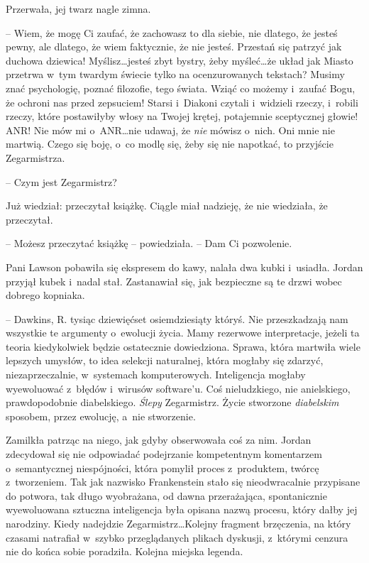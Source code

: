 \documentclass[oneside,polish,11pt,sfheadings]{mwbk}
\begin{document}
Przerwała, jej twarz nagle zimna.

-- Wiem, że mogę Ci zaufać, że zachowasz to dla siebie, nie dlatego, że
jesteś pewny, ale dlatego, że wiem faktycznie, że nie jesteś. Przestań
się patrzyć jak duchowa dziewica! Myślisz\ldots jesteś zbyt bystry, żeby
myśleć\ldots że układ jak Miasto przetrwa w~tym twardym świecie tylko na
ocenzurowanych tekstach? Musimy znać psychologię, poznać filozofie, tego
świata. Wziąć co możemy i~zaufać Bogu, że ochroni nas przed zepsuciem!
Starsi i~Diakoni czytali i~widzieli rzeczy, i~robili rzeczy, które
postawiłyby włosy na Twojej krętej, potajemnie sceptycznej głowie! ANR!
Nie mów mi o~ANR\ldots nie udawaj, że \emph{nie} mówisz o~nich. Oni mnie
nie martwią. Czego się boję, o~co modlę się, żeby się nie napotkać, to
przyjście Zegarmistrza.

-- Czym jest Zegarmistrz?

Już wiedział: przeczytał książkę. Ciągle miał nadzieję, że nie
wiedziała, że przeczytał.

-- Możesz przeczytać książkę -- powiedziała. -- Dam Ci pozwolenie.

Pani Lawson pobawiła się ekspresem do kawy, nalała dwa kubki i~usiadła.
Jordan przyjął kubek i~nadal stał. Zastanawiał się, jak bezpieczne są te
drzwi wobec dobrego kopniaka.

-- Dawkins, R. tysiąc dziewięćset osiemdziesiąty któryś. Nie
przeszkadzają nam wszystkie te argumenty o~ewolucji życia. Mamy
rezerwowe interpretacje, jeżeli ta teoria kiedykolwiek będzie
ostatecznie dowiedziona. Sprawa, która martwiła wiele lepszych umysłów,
to idea selekcji naturalnej, która mogłaby się zdarzyć,
niezaprzeczalnie, w~systemach komputerowych. Inteligencja mogłaby
wyewoluować z~błędów i~wirusów software'u. Coś nieludzkiego, nie
anielskiego, prawdopodobnie diabelskiego. \emph{Ślepy} Zegarmistrz.
Życie stworzone \emph{diabelskim} sposobem, przez ewolucję, a~nie
stworzenie.

Zamilkła patrząc na niego, jak gdyby obserwowała coś za nim. Jordan
zdecydował się nie odpowiadać podejrzanie kompetentnym komentarzem o~semantycznej niespójności, która pomylił proces z~produktem, twórcę z~tworzeniem. Tak jak nazwisko Frankenstein stało się nieodwracalnie
przypisane do potwora, tak długo wyobrażana, od dawna przerażająca,
spontanicznie wyewoluowana sztuczna inteligencja była opisana nazwą
procesu, który dałby jej narodziny. Kiedy nadejdzie Zegarmistrz\ldots Kolejny fragment brzęczenia, na który czasami natrafiał w~szybko
przeglądanych plikach dyskusji, z~którymi cenzura nie do końca sobie
poradziła. Kolejna miejska legenda.
\end{document}
